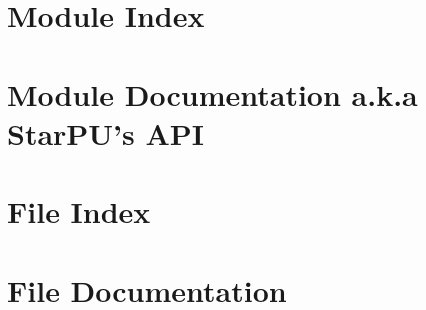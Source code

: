 \documentclass{book}
\begin{document}
\chapter{Module Index}


\chapter{Module Documentation a.k.a StarPU's API}
\label{ModuleDocumentation}
\hypertarget{ModuleDocumentation}{}


































\chapter{File Index}


\chapter{File Documentation}
\label{FileDocumentation}
\hypertarget{FileDocumentation}{}
\end{document}
